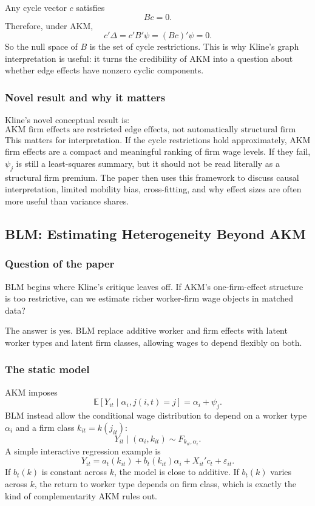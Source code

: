 \documentclass[11pt]{article}
\newcommand{\E}{\mathbb{E}}
\newcommand{\1}{\mathbf{1}}
\begin{document}
Any cycle vector $c$ satisfies
\[
Bc=0.
\]
Therefore, under AKM,
\[
c'\Delta
=
c'B'\psi
=
(Bc)'\psi
=0.
\]
So the null space of $B$ is the set of cycle restrictions. This is why Kline's graph interpretation is useful: it turns the credibility of AKM into a question about whether edge effects have nonzero cyclic components.

\subsubsection*{Novel result and why it matters}

Kline's novel conceptual result is:
\[
\boxed{
\text{AKM firm effects are restricted edge effects, not automatically structural firm primitives.}
}
\]
This matters for interpretation. If the cycle restrictions hold approximately, AKM firm effects are a compact and meaningful ranking of firm wage levels. If they fail, $\psi_j$ is still a least-squares summary, but it should not be read literally as a structural firm premium. The paper then uses this framework to discuss causal interpretation, limited mobility bias, cross-fitting, and why effect sizes are often more useful than variance shares.

\subsection{BLM: Estimating Heterogeneity Beyond AKM}

\subsubsection*{Question of the paper}

BLM begins where Kline's critique leaves off. If AKM's one-firm-effect structure is too restrictive, can we estimate richer worker-firm wage objects in matched data?

The answer is yes. BLM replace additive worker and firm effects with latent worker types and latent firm classes, allowing wages to depend flexibly on both.

\subsubsection*{The static model}

AKM imposes
\[
\E[Y_{it}\mid \alpha_i,j(i,t)=j]
=
\alpha_i+\psi_j.
\]
BLM instead allow the conditional wage distribution to depend on a worker type $\alpha_i$ and a firm class $k_{it}=k(j_{it})$:
\[
Y_{it}\mid (\alpha_i,k_{it})
\sim
F_{k_{it},\alpha_i}.
\]
A simple interactive regression example is
\[
Y_{it}
=
a_t(k_{it})+b_t(k_{it})\alpha_i+X_{it}'c_t+\varepsilon_{it}.
\]
If $b_t(k)$ is constant across $k$, the model is close to additive. If $b_t(k)$ varies across $k$, the return to worker type depends on firm class, which is exactly the kind of complementarity AKM rules out.
\end{document}
